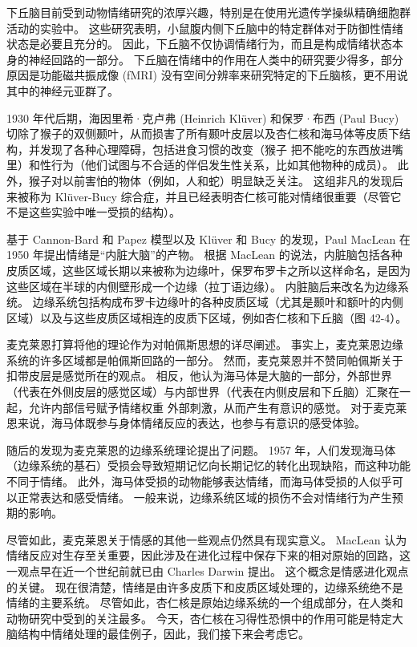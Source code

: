 下丘脑目前受到动物情绪研究的浓厚兴趣，特别是在使用光遗传学操纵精确细胞群活动的实验中。 这些研究表明，小鼠腹内侧下丘脑中的特定群体对于防御性情绪状态是必要且充分的。 因此，下丘脑不仅协调情绪行为，而且是构成情绪状态本身的神经回路的一部分。 下丘脑在情绪中的作用在人类中的研究要少得多，部分原因是功能磁共振成像 (fMRI) 没有空间分辨率来研究特定的下丘脑核，更不用说其中的神经元亚群了。

1930 年代后期，海因里希·克卢弗 (Heinrich Klüver) 和保罗·布西 (Paul Bucy) 切除了猴子的双侧颞叶，从而损害了所有颞叶皮层以及杏仁核和海马体等皮质下结构，并发现了各种心理障碍，包括进食习惯的改变（猴子 把不能吃的东西放进嘴里）和性行为（他们试图与不合适的伴侣发生性关系，比如其他物种的成员）。 此外，猴子对以前害怕的物体（例如，人和蛇）明显缺乏关注。 这组非凡的发现后来被称为 Klüver-Bucy 综合症，并且已经表明杏仁核可能对情绪很重要（尽管它不是这些实验中唯一受损的结构）。

基于 Cannon-Bard 和 Papez 模型以及 Klüver 和 Bucy 的发现，Paul MacLean 在 1950 年提出情绪是“内脏大脑”的产物。 根据 MacLean 的说法，内脏脑包括各种皮质区域，这些区域长期以来被称为边缘叶，保罗布罗卡之所以这样命名，是因为这些区域在半球的内侧壁形成一个边缘（拉丁语边缘）。 内脏脑后来改名为边缘系统。 边缘系统包括构成布罗卡边缘叶的各种皮质区域（尤其是颞叶和额叶的内侧区域）以及与这些皮质区域相连的皮质下区域，例如杏仁核和下丘脑（图 42-4）。

麦克莱恩打算将他的理论作为对帕佩斯思想的详尽阐述。 事实上，麦克莱恩边缘系统的许多区域都是帕佩斯回路的一部分。 然而，麦克莱恩并不赞同帕佩斯关于扣带皮层是感觉所在的观点。 相反，他认为海马体是大脑的一部分，外部世界（代表在外侧皮层的感觉区域）与内部世界（代表在内侧皮层和下丘脑）汇聚在一起，允许内部信号赋予情绪权重 外部刺激，从而产生有意识的感觉。 对于麦克莱恩来说，海马体既参与身体情绪反应的表达，也参与有意识的感受体验。

随后的发现为麦克莱恩的边缘系统理论提出了问题。 1957 年，人们发现海马体（边缘系统的基石）受损会导致短期记忆向长期记忆的转化出现缺陷，而这种功能不同于情绪。 此外，海马体受损的动物能够表达情绪，而海马体受损的人似乎可以正常表达和感受情绪。 一般来说，边缘系统区域的损伤不会对情绪行为产生预期的影响。

尽管如此，麦克莱恩关于情感的其他一些观点仍然具有现实意义。 MacLean 认为情绪反应对生存至关重要，因此涉及在进化过程中保存下来的相对原始的回路，这一观点早在近一个世纪前就已由 Charles Darwin 提出。 这个概念是情感进化观点的关键。 现在很清楚，情绪是由许多皮质下和皮质区域处理的，边缘系统绝不是情绪的主要系统。 尽管如此，杏仁核是原始边缘系统的一个组成部分，在人类和动物研究中受到的关注最多。 今天，杏仁核在习得性恐惧中的作用可能是特定大脑结构中情绪处理的最佳例子，因此，我们接下来会考虑它。


